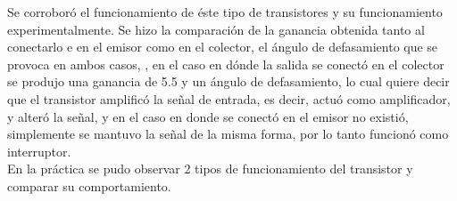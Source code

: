 \documentclass{article}
\begin{document}
Se corroboró el funcionamiento de éste tipo de transistores y su funcionamiento experimentalmente. Se hizo la comparación de la ganancia obtenida tanto al conectarlo e en el emisor como en el colector, el ángulo de defasamiento que se provoca en ambos casos, , en el caso en dónde la salida se conectó en el colector se produjo una ganancia de 5.5 y un ángulo de defasamiento, lo cual quiere decir que el transistor amplificó la señal de entrada, es decir, actuó como amplificador, y alteró la señal, y en el caso en donde se conectó en el emisor no existió, simplemente se mantuvo la señal de la misma forma, por lo tanto funcionó como interruptor.\\

En la práctica se pudo observar 2 tipos de funcionamiento del transistor y comparar su comportamiento.\\









\end{document}
